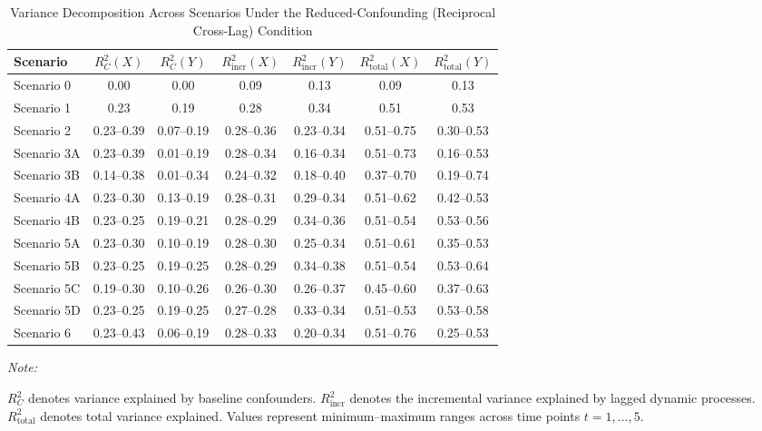 \begin{table}[!h]
\centering
\caption{\label{tab:R2_reduced_bothCL}Variance Decomposition Across Scenarios Under the Reduced-Confounding (Reciprocal Cross-Lag) Condition}
\centering
\fontsize{10}{12}\selectfont
\begin{threeparttable}
\begin{tabular}[t]{lcccccc}
\toprule
Scenario & $R_C^2(X)$ & $R_C^2(Y)$ & $R_{\text{incr}}^2(X)$ & $R_{\text{incr}}^2(Y)$ & $R_{\text{total}}^2(X)$ & $R_{\text{total}}^2(Y)$\\
\midrule
Scenario 0 & 0.00 & 0.00 & 0.09 & 0.13 & 0.09 & 0.13\\
Scenario 1 & 0.23 & 0.19 & 0.28 & 0.34 & 0.51 & 0.53\\
Scenario 2 & 0.23--0.39 & 0.07--0.19 & 0.28--0.36 & 0.23--0.34 & 0.51--0.75 & 0.30--0.53\\
Scenario 3A & 0.23--0.39 & 0.01--0.19 & 0.28--0.34 & 0.16--0.34 & 0.51--0.73 & 0.16--0.53\\
Scenario 3B & 0.14--0.38 & 0.01--0.34 & 0.24--0.32 & 0.18--0.40 & 0.37--0.70 & 0.19--0.74\\
\addlinespace
Scenario 4A & 0.23--0.30 & 0.13--0.19 & 0.28--0.31 & 0.29--0.34 & 0.51--0.62 & 0.42--0.53\\
Scenario 4B & 0.23--0.25 & 0.19--0.21 & 0.28--0.29 & 0.34--0.36 & 0.51--0.54 & 0.53--0.56\\
Scenario 5A & 0.23--0.30 & 0.10--0.19 & 0.28--0.30 & 0.25--0.34 & 0.51--0.61 & 0.35--0.53\\
Scenario 5B & 0.23--0.25 & 0.19--0.25 & 0.28--0.29 & 0.34--0.38 & 0.51--0.54 & 0.53--0.64\\
Scenario 5C & 0.19--0.30 & 0.10--0.26 & 0.26--0.30 & 0.26--0.37 & 0.45--0.60 & 0.37--0.63\\
\addlinespace
Scenario 5D & 0.23--0.25 & 0.19--0.25 & 0.27--0.28 & 0.33--0.34 & 0.51--0.53 & 0.53--0.58\\
Scenario 6 & 0.23--0.43 & 0.06--0.19 & 0.28--0.33 & 0.20--0.34 & 0.51--0.76 & 0.25--0.53\\
\bottomrule
\end{tabular}
\begin{tablenotes}
\item \textit{Note: } 
\item $R_C^2$ denotes variance explained by baseline confounders. $R_{\text{incr}}^2$ denotes the incremental variance explained by lagged dynamic processes. $R_{\text{total}}^2$ denotes total variance explained. Values represent minimum--maximum ranges across time points $t = 1, \dots, 5$.
\end{tablenotes}
\end{threeparttable}
\end{table}
